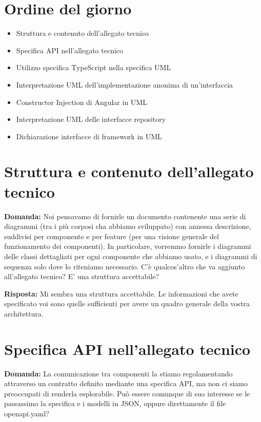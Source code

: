 \documentclass{article}
\begin{document}
\section{Ordine del giorno}%
\label{sec:ordine_del_giorno}

\begin{itemize}
  \item Struttura e contenuto dell'allegato tecnico
  \item Specifica API nell'allegato tecnico
  \item Utilizzo specifica TypeScript nella specifica UML
  \item Interpretazione UML dell'implementazione anonima di un'interfaccia
  \item Constructor Injection di Angular in UML
  \item Interpretazione UML delle interfacce repository
  \item Dichiarazione interfacce di framework in UML
\end{itemize}

\section{Struttura e contenuto dell'allegato tecnico}%
\label{sec:struttura_e_contenuto_allegato_tecnico}

\textbf{Domanda:} Noi pensavamo di fornirle un documento contenente una serie di diagrammi (tra i più corposi cha abbiamo sviluppato) con annessa descrizione, suddivisi per componente e per feature (per una visione generale del funzionamento dei componenti). In particolare, vorremmo fornirle i diagrammi delle classi dettagliati per ogni componente che abbiamo usato, e i diagrammi di sequenza solo dove lo riteniamo necessario. C'è qualcos'altro che va aggiunto all'allegato tecnico? E' una struttura accettabile?

\textbf{Risposta:} Mi sembra una struttura accettabile. Le informazioni che avete specificato voi sono quelle sufficienti per avere un quadro generale della vostra architettura.

\section{Specifica API nell'allegato tecnico}%
\label{sec:specifica_api_allegato_tecnico}

\textbf{Domanda:} La comunicazione tra componenti la stiamo regolamentando attraverso un contratto definito mediante una specifica API, ma non ci siamo preoccupati di renderla esplorabile. Può essere comunque di suo interesse se le passassimo la specifica e i modelli in JSON, oppure direttamente il file openapi.yaml?
\end{document}
